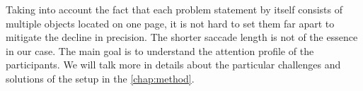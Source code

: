 Taking into account the fact that each problem statement by itself consists of multiple objects located on one page, it is not hard to set them far apart to mitigate the decline in precision. The shorter saccade length is not of the essence in our case. The main goal is to understand the attention profile of the participants. We will talk more in details about the particular challenges and solutions of the setup in the \autoref{chap:method}.
